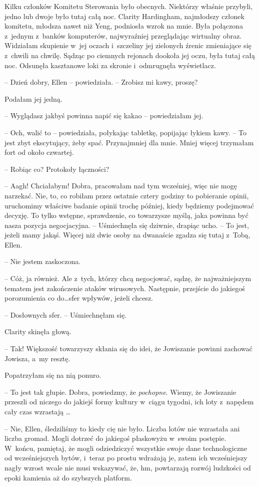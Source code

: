 \documentclass[oneside,polish,11pt,sfheadings]{mwbk}
\begin{document}
Kilku członków Komitetu Sterowania było obecnych. Niektórzy właśnie
przybyli, jedno lub dwoje było tutaj całą noc. Clarity Hardingham,
najmłodszy członek komitetu, młodsza nawet niż Yeng, podniosła wzrok na
mnie. Była połączona z~jednym z~banków komputerów, najwyraźniej
przeglądając wirtualny obraz. Widziałam skupienie w~jej oczach i~szczeliny jej zielonych źrenic zmieniające się z~chwili na chwilę.
Sądząc po ciemnych rejonach dookoła jej oczu, była tutaj całą noc.
Odsunęła kasztanowe loki za skronie i~odmrugnęła wyświetlacz.

-- Dzień dobry, Ellen -- powiedziała. -- Zrobisz mi kawy, proszę?

Podałam jej jedną. 

-- Wyglądasz jakbyś powinna napić się kakao -- powiedziałam jej.

-- Och, walić to -- powiedziała, połykając tabletkę, popijając łykiem
kawy. -- To jest zbyt ekscytujący, żeby spać. Przynajmniej dla mnie.
Mniej więcej trzymałam fort od około czwartej.

-- Robiąc co? Protokoły łączności?

-- Aagh! Chciałabym! Dobra, pracowałam nad tym wcześniej, więc nie mogę
narzekać. Nie, to, co robiłam przez ostatnie cztery godziny to
pobieranie opinii, uruchomimy właściwe badanie opinii trochę później,
kiedy będziemy podejmować decyzję. To tylko wstępne, sprawdzenie, co
towarzysze myślą, jaka powinna być nasza pozycja negocjacyjna. -- Uśmiechnęła się dziwnie, drapiąc ucho. -- To jest, jeżeli mamy jakąś.
Więcej niż dwie osoby na dwanaście zgadza się tutaj z~Tobą, Ellen.

-- Nie jestem zaskoczona.

-- Cóż, ja również. Ale z~tych, którzy chcą negocjować, sądzę, że
najważniejszym tematem jest zakończenie ataków wirusowych. Następnie,
przejście do jakiegoś porozumienia co do\ldots  sfer wpływów, jeżeli chcesz.

-- Dosłownych sfer. -- Uśmiechnęłam się.

Clarity skinęła głową. 

-- Tak! Większość towarzyszy skłania się do idei,
że Jowiszanie powinni zachować Jowisza, a~my resztę.

Popatrzyłam się na nią ponuro. 

-- To jest tak głupie. Dobra, powiedzmy,
że \textit{pochopne}. Wiemy, że Jowiszanie przeszli od niczego do jakiejś
formy kultury w~ciągu tygodni, ich loty z~napędem cały czas wzrastają
\ldots 

-- Nie, Ellen, śledziliśmy to kiedy cię nie było. Liczba lotów nie
wzrastała ani liczba gromad. Mogli dotrzeć do jakiegoś płaskowyżu w~swoim postępie. W~końcu, pamiętaj, że mogli odziedziczyć wszystkie swoje
dane technologiczne od wcześniejszych bytów, i~teraz po prostu wdrażają
je, zatem ich wcześniejszy nagły wzrost wcale nie musi wskazywać, że,
hm, powtarzają rozwój ludzkości od epoki kamienia aż do szybszych
platform.
\end{document}
